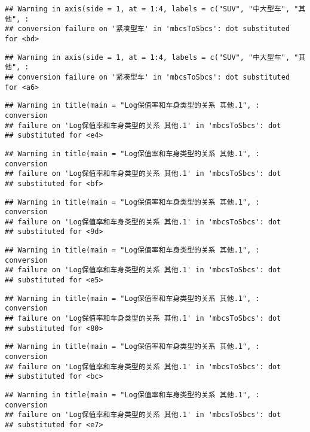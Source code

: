 \documentclass[]{article}
\begin{document}
\begin{verbatim}
## Warning in axis(side = 1, at = 1:4, labels = c("SUV", "中大型车", "其他", :
## conversion failure on '紧凑型车' in 'mbcsToSbcs': dot substituted for <bd>
\end{verbatim}

\begin{verbatim}
## Warning in axis(side = 1, at = 1:4, labels = c("SUV", "中大型车", "其他", :
## conversion failure on '紧凑型车' in 'mbcsToSbcs': dot substituted for <a6>
\end{verbatim}

\begin{verbatim}
## Warning in title(main = "Log保值率和车身类型的关系 其他.1", : conversion
## failure on 'Log保值率和车身类型的关系 其他.1' in 'mbcsToSbcs': dot
## substituted for <e4>
\end{verbatim}

\begin{verbatim}
## Warning in title(main = "Log保值率和车身类型的关系 其他.1", : conversion
## failure on 'Log保值率和车身类型的关系 其他.1' in 'mbcsToSbcs': dot
## substituted for <bf>
\end{verbatim}

\begin{verbatim}
## Warning in title(main = "Log保值率和车身类型的关系 其他.1", : conversion
## failure on 'Log保值率和车身类型的关系 其他.1' in 'mbcsToSbcs': dot
## substituted for <9d>
\end{verbatim}

\begin{verbatim}
## Warning in title(main = "Log保值率和车身类型的关系 其他.1", : conversion
## failure on 'Log保值率和车身类型的关系 其他.1' in 'mbcsToSbcs': dot
## substituted for <e5>
\end{verbatim}

\begin{verbatim}
## Warning in title(main = "Log保值率和车身类型的关系 其他.1", : conversion
## failure on 'Log保值率和车身类型的关系 其他.1' in 'mbcsToSbcs': dot
## substituted for <80>
\end{verbatim}

\begin{verbatim}
## Warning in title(main = "Log保值率和车身类型的关系 其他.1", : conversion
## failure on 'Log保值率和车身类型的关系 其他.1' in 'mbcsToSbcs': dot
## substituted for <bc>
\end{verbatim}

\begin{verbatim}
## Warning in title(main = "Log保值率和车身类型的关系 其他.1", : conversion
## failure on 'Log保值率和车身类型的关系 其他.1' in 'mbcsToSbcs': dot
## substituted for <e7>
\end{verbatim}
\end{document}
